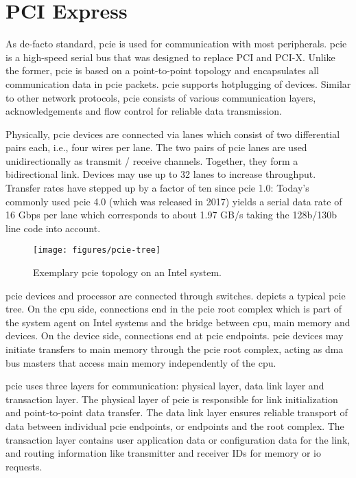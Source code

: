 \section{PCI Express}
\label{sec:pcie}

As de-facto standard, \acf{pcie} is used for communication with most peripherals.
\ac{pcie} is a high-speed serial bus that was designed to replace PCI and PCI-X.
Unlike the former, \ac{pcie} is based on a point-to-point topology and
encapsulates all communication data in \ac{pcie} packets. \ac{pcie} supports
hotplugging of devices. Similar to other network protocols, \ac{pcie} consists
of various communication layers, acknowledgements and flow control for reliable
data transmission.

Physically, \ac{pcie} devices are connected via lanes which consist of two
differential pairs each, i.e., four wires per lane. The two pairs of \ac{pcie}
lanes are used unidirectionally as transmit / receive channels. Together, they
form a bidirectional link. Devices may use up to 32 lanes to increase
throughput. Transfer rates have stepped up by a factor of ten since \ac{pcie}
1.0: Today's commonly used \ac{pcie} 4.0 (which was released in 2017) yields a
serial data rate of 16 Gbps per lane which corresponds to about 1.97 GB/s taking
the 128b/130b line code into account.

\begin{figure}[!b]
    \centering
    \texttt{[image: figures/pcie-tree]}
    \caption{Exemplary \acs{pcie} topology on an Intel system.}
    \label{fig:pcie-topology}
\end{figure}

\ac{pcie} devices and processor are connected through switches.
 depicts a typical \ac{pcie} tree. On the \ac{cpu}
side, connections end in the \ac{pcie} root complex which is part of the system
agent on Intel systems and the bridge between \ac{cpu}, main memory and devices.
On the device side, connections end at \ac{pcie} endpoints. \ac{pcie} devices
may initiate transfers to main memory through the \ac{pcie} root complex, acting
as \acs{dma} bus masters that access main memory independently of the \ac{cpu}.

\ac{pcie} uses three layers for communication: physical layer, data link layer
and transaction layer. The physical layer of \ac{pcie} is responsible for link
initialization and point-to-point data transfer. The data link layer ensures
reliable transport of data between individual \ac{pcie} endpoints, or endpoints
and the root complex. The transaction layer contains user application data or
configuration data for the link, and routing information like transmitter and
receiver IDs for memory or \ac{io} requests.

